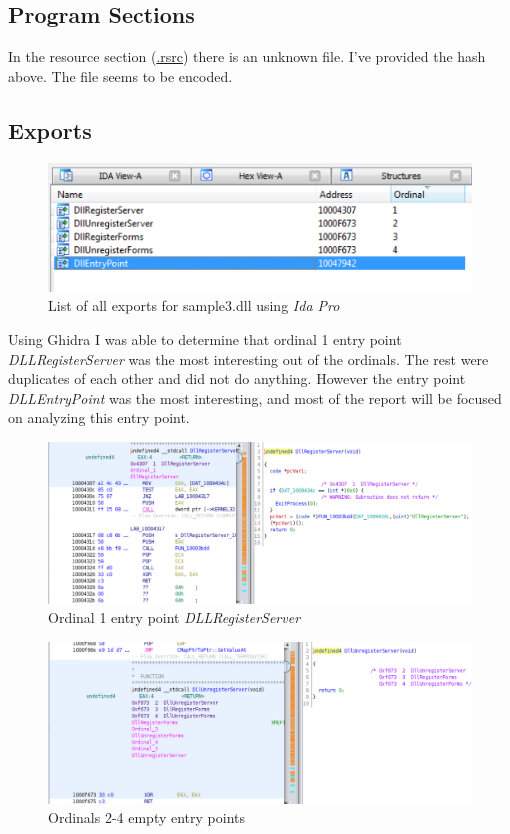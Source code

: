 \documentclass{article}
\begin{document}
    \subsection{Program Sections}
    In the resource section (\url{.rsrc}) there is an unknown file. I've provided the hash above. The file seems to be encoded.
    \subsection{Exports}
    \begin{figure}[H]
        \includegraphics[width=\textwidth]{dllentrypoints.png}
        \caption{List of all exports for sample3.dll using \textit{Ida Pro}}
    \end{figure}
    Using Ghidra I was able to determine that ordinal 1 entry point \textit{DLLRegisterServer} was the most interesting out of the ordinals. The rest were duplicates of each other and did not do anything. However the entry point \textit{DLLEntryPoint} was the most interesting, and most of the report will be focused on analyzing this entry point.
    \begin{figure}[H]
        \includegraphics[width=\textwidth]{export1.png}
        \caption{Ordinal 1 entry point \textit{DLLRegisterServer}}
    \end{figure}
    \begin{figure}[H]
        \includegraphics[width=\textwidth]{exports2-4.png}
        \caption{Ordinals 2-4 empty entry points}
    \end{figure}
\end{document}
